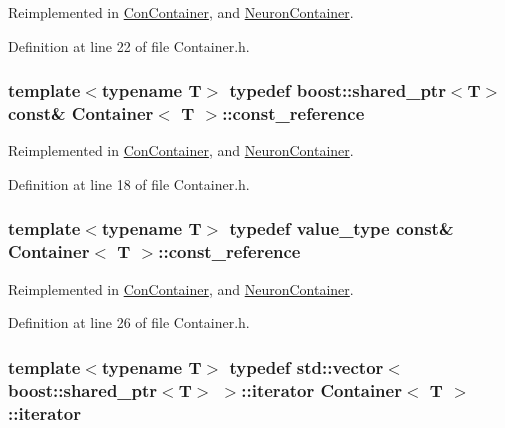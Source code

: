 Reimplemented in \hyperlink{class_con_container_ac314ee4e351b3a5f595cd1de74fb3b5e}{ConContainer}, and \hyperlink{class_neuron_container_a41749602f05e7610da7f0f1fd59f5442}{NeuronContainer}.



Definition at line 22 of file Container.h.

\hypertarget{class_container_a9aaab0502055ee85ce5d3633fbca2675}{
\subsubsection[{const\_\-reference}]{\setlength{\rightskip}{0pt plus 5cm}template$<$typename T$>$ typedef boost::shared\_\-ptr$<$T$>$ const\& {\bf Container}$<$ T $>$::{\bf const\_\-reference}}}
\label{class_container_a9aaab0502055ee85ce5d3633fbca2675}


Reimplemented in \hyperlink{class_con_container_ac644eca2f5ee432a6070fd1d397b3741}{ConContainer}, and \hyperlink{class_neuron_container_a468ffbb00b15553f73da46dd62c91c8d}{NeuronContainer}.



Definition at line 18 of file Container.h.

\hypertarget{class_container_a8dd7ae9d0687e11d873f98206e961ac1}{
\subsubsection[{const\_\-reference}]{\setlength{\rightskip}{0pt plus 5cm}template$<$typename T$>$ typedef {\bf value\_\-type} const\& {\bf Container}$<$ T $>$::{\bf const\_\-reference}}}
\label{class_container_a8dd7ae9d0687e11d873f98206e961ac1}


Reimplemented in \hyperlink{class_con_container_ac644eca2f5ee432a6070fd1d397b3741}{ConContainer}, and \hyperlink{class_neuron_container_a468ffbb00b15553f73da46dd62c91c8d}{NeuronContainer}.



Definition at line 26 of file Container.h.

\hypertarget{class_container_afe880028d8304353129f47cd1d28c20a}{
\subsubsection[{iterator}]{\setlength{\rightskip}{0pt plus 5cm}template$<$typename T$>$ typedef std::vector$<$boost::shared\_\-ptr$<$T$>$ $>$::{\bf iterator} {\bf Container}$<$ T $>$::{\bf iterator}}}
\label{class_container_afe880028d8304353129f47cd1d28c20a}


